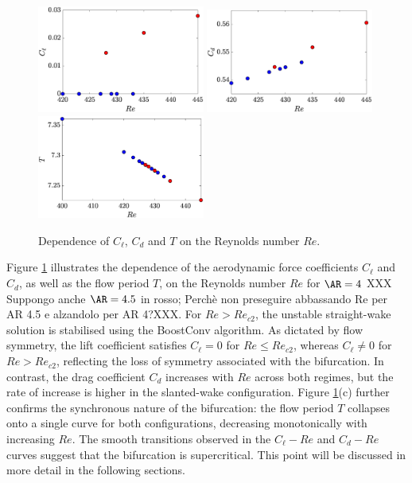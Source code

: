 \begin{figure}
  \centering
  \includegraphics[width=0.49\textwidth]{./fig/AR4_Cl_Re.eps}
  \includegraphics[width=0.49\textwidth]{./fig/AR4_Cd_Re.eps}
  \includegraphics[width=0.49\textwidth]{./fig/AR4_T_Re.eps}
  \caption{Dependence of $C_\ell$, $C_d$ and $T$ on the Reynolds number $Re$.}
  \label{fig:Cl-Cd-AR4}
\end{figure}
%
Figure \ref{fig:Cl-Cd-AR4} illustrates the dependence of the aerodynamic force coefficients $C_\ell$ and $C_d$, as well as the flow period $T$, on the Reynolds number $Re$ for $\AR=4$ XXX Suppongo anche $\AR=4.5$ in rosso; Perchè non preseguire abbassando Re per AR 4.5 e alzandolo per AR 4?XXX. For $Re>Re_{c2}$, the unstable straight-wake solution is stabilised using the BoostConv algorithm. As dictated by flow symmetry, the lift coefficient satisfies $C_\ell=0$ for $Re \le Re_{c2}$, whereas $C_\ell \neq 0$ for $Re> Re_{c2}$, reflecting the loss of symmetry associated with the bifurcation. In contrast, the drag coefficient $C_d$ increases with $Re$ across both regimes, but the rate of increase is higher in the slanted-wake configuration.
%
Figure \ref{fig:Cl-Cd-AR4}(c) further confirms the synchronous nature of the bifurcation: the flow period $T$ collapses onto a single curve for both configurations, decreasing monotonically with increasing $Re$. The smooth transitions observed in the $C_\ell-Re$ and $C_d-Re$ curves suggest that the bifurcation is supercritical. This point will be discussed in more detail in the following sections.

